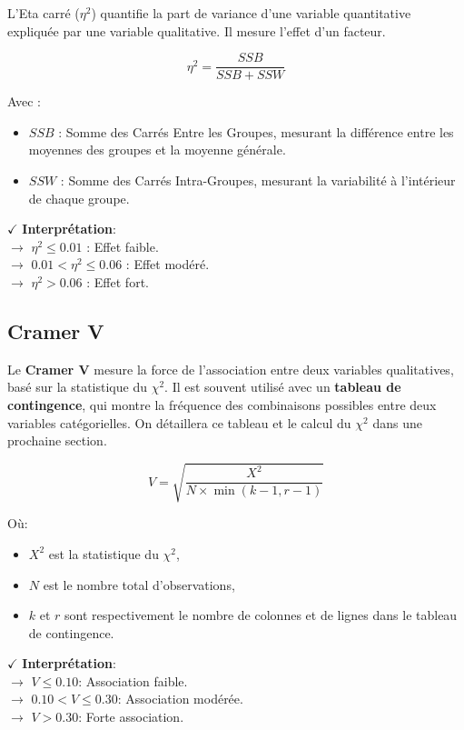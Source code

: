 L'Eta carré (\(\eta^2\)) quantifie la part de variance d'une variable quantitative expliquée par une variable qualitative. Il mesure l'effet d'un facteur.

\[
\eta^2 = \frac{SSB}{SSB + SSW}
\]

Avec :
\begin{itemize}
    \item \( SSB \) : Somme des Carrés Entre les Groupes, mesurant la différence entre les moyennes des groupes et la moyenne générale.
    \item \( SSW \) : Somme des Carrés Intra-Groupes, mesurant la variabilité à l'intérieur de chaque groupe.
\end{itemize}

\textbf{\(\checkmark\)} \textbf{Interprétation}:\\
\noindent \textbf{\(\rightarrow\)} \(\eta^2 \leq 0.01\) : Effet faible.\\
\textbf{\(\rightarrow\)} \(0.01 < \eta^2 \leq 0.06\) : Effet modéré.\\
\textbf{\(\rightarrow\)} \(\eta^2 > 0.06\) : Effet fort.

\subsection{Cramer V}

Le \textbf{Cramer V} mesure la force de l'association entre deux variables qualitatives, basé sur la statistique du \(\chi^2\). Il est souvent utilisé avec un \textbf{tableau de contingence}, qui montre la fréquence des combinaisons possibles entre deux variables catégorielles. On détaillera ce tableau et le calcul du \(\chi^2\) dans une prochaine section.

\[
V = \sqrt{\frac{X^2}{N \times \min(k-1, r-1)}}
\]

Où:
\begin{itemize}
    \item \(X^2\) est la statistique du \(\chi^2\),
    \item \(N\) est le nombre total d’observations,
    \item \(k\) et \(r\) sont respectivement le nombre de colonnes et de lignes dans le tableau de contingence.
\end{itemize}

\textbf{\(\checkmark\)} \textbf{Interprétation}: \\
\noindent \textbf{\(\rightarrow\)} $V \leq 0.10$: Association faible.\\
\textbf{\(\rightarrow\)} $0.10 < V \leq 0.30$: Association modérée.\\
\textbf{\(\rightarrow\)} $V > 0.30$: Forte association.

